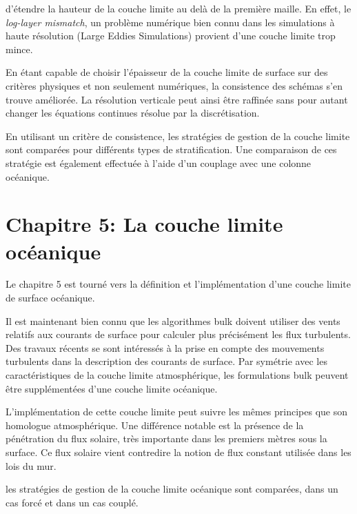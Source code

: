 	d'étendre la hauteur de la couche limite au delà
	de la première maille.
	En effet, le \textit{log-layer mismatch},
	un problème numérique bien connu dans les
	simulations à haute résolution (Large Eddies
	Simulations)
	provient d'une couche limite trop mince.
\par
En étant capable de choisir l'épaisseur de la couche
	limite de surface sur des critères physiques et non
	seulement numériques, la consistence des schémas
	s'en trouve améliorée. La résolution verticale
	peut ainsi être raffinée sans pour autant changer
	les équations continues résolue par la
			discrétisation.
\par
En utilisant un critère de consistence, les stratégies
	de gestion de la couche limite sont
	comparées pour différents types de stratification.
	Une comparaison de ces stratégie est également effectuée
	à l'aide d'un couplage avec une colonne océanique.
\section*{Chapitre 5: La couche limite océanique}
Le chapitre 5 est tourné vers la définition et l'implémentation
d'une couche limite de surface océanique.
\par
Il est maintenant bien connu que les algorithmes
	bulk doivent utiliser des vents relatifs aux
	courants de surface pour calculer plus précisément
	les flux turbulents.
	Des travaux récents \citep{pelletier_two-sided_2021}
	se sont intéressés à la prise en compte des mouvements
	turbulents dans la description des courants de
	surface. Par symétrie avec les caractéristiques
	de la couche limite atmosphérique, les formulations
	bulk peuvent être supplémentées d'une couche
	limite océanique.
\par
L'implémentation de cette couche limite peut suivre
	les mêmes principes que son homologue atmosphérique.
	Une différence notable est la présence de la
	pénétration du flux solaire, très importante dans
	les premiers mètres sous la surface.
	Ce flux solaire vient contredire la notion de flux
	constant utilisée dans les lois du mur.
\par
les stratégies de gestion de la couche limite
	océanique sont comparées, dans un cas forcé et
	dans un cas couplé.
